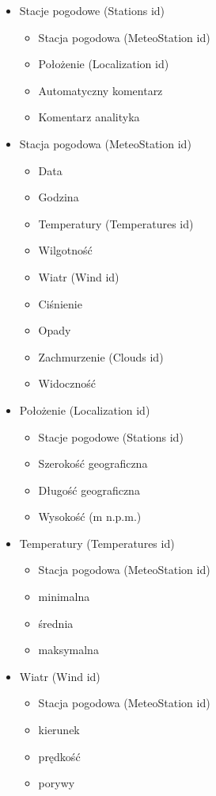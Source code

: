 \documentclass[12pt,a4paper]{article}
\begin{document}
\begin{itemize}
\small
\item Stacje pogodowe (Stations id)
    \begin{itemize}
	\item Stacja pogodowa (MeteoStation id)
	\item Położenie (Localization id)
    \item Automatyczny komentarz
    \item Komentarz analityka
    \end{itemize}
\item Stacja pogodowa (MeteoStation id)
    \begin{itemize}
    \item Data
    \item Godzina
    \item Temperatury (Temperatures id)
    \item Wilgotność
    \item Wiatr (Wind id)
    \item Ciśnienie
    \item Opady
    \item Zachmurzenie (Clouds id)
    \item Widoczność
    \end{itemize}
\item Położenie (Localization id)
	\begin{itemize}
	\item Stacje pogodowe (Stations id)
	\item Szerokość geograficzna
    \item Długość geograficzna
    \item Wysokość (m n.p.m.)
	\end{itemize}
\item Temperatury (Temperatures id)
    \begin{itemize}
    \item Stacja pogodowa (MeteoStation id)
    \item minimalna
    \item średnia
    \item maksymalna
    \end{itemize}
\item Wiatr (Wind id)
    \begin{itemize}
    \item Stacja pogodowa (MeteoStation id)
    \item kierunek
    \item prędkość
    \item porywy

\end{itemize}
\end{itemize}
\end{document}
